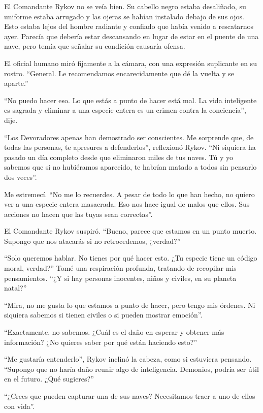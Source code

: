 \documentclass[spanish,12pt,a4paper,oneside,titlepage]{book}
\begin{document}
    El Comandante Rykov no se veía bien. Su cabello negro estaba desaliñado, su uniforme estaba arrugado y las ojeras se habían instalado debajo de sus ojos. Esto estaba lejos del hombre radiante y confiado que había venido a rescatarnos ayer. Parecía que debería estar descansando en lugar de estar en el puente de una nave, pero temía que señalar su condición causaría ofensa.

    El oficial humano miró fijamente a la cámara, con una expresión suplicante en su rostro. “General. Le recomendamos encarecidamente que dé la vuelta y se aparte.”

    “No puedo hacer eso. Lo que estás a punto de hacer está mal. La vida inteligente es sagrada y eliminar a una especie entera es un crimen contra la conciencia”, dije.

    “Los Devoradores apenas han demostrado ser conscientes. Me sorprende que, de todas las personas, te apresures a defenderlos”, reflexionó Rykov. “Ni siquiera ha pasado un día completo desde que eliminaron miles de tus naves. Tú y yo sabemos que si no hubiéramos aparecido, te habrían matado a todos sin pensarlo dos veces”.

    Me estremecí. “No me lo recuerdes. A pesar de todo lo que han hecho, no quiero ver a una especie entera masacrada. Eso nos hace igual de malos que ellos. Sus acciones no hacen que las tuyas sean correctas”.

    El Comandante Rykov suspiró. “Bueno, parece que estamos en un punto muerto. Supongo que nos atacarás si no retrocedemos, ¿verdad?”

    “Solo queremos hablar. No tienes por qué hacer esto. ¿Tu especie tiene un código moral, verdad?” Tomé una respiración profunda, tratando de recopilar mis pensamientos. “¿Y si hay personas inocentes, niños y civiles, en su planeta natal?”

    “Mira, no me gusta lo que estamos a punto de hacer, pero tengo mis órdenes. Ni siquiera sabemos si tienen civiles o si pueden mostrar emoción”.

    “Exactamente, no sabemos. ¿Cuál es el daño en esperar y obtener más información? ¿No quieres saber por qué están haciendo esto?”

    “Me gustaría entenderlo”, Rykov inclinó la cabeza, como si estuviera pensando. “Supongo que no haría daño reunir algo de inteligencia. Demonios, podría ser útil en el futuro. ¿Qué sugieres?”

    “¿Crees que pueden capturar una de sus naves? Necesitamos traer a uno de ellos con vida”.
\end{document}
